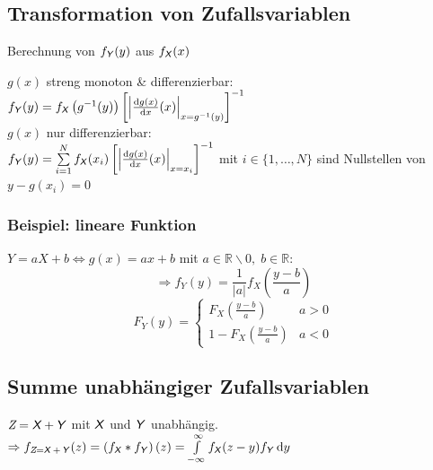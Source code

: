 \documentclass[german,color,6pt]{latex4ei/latex4ei_sheet}
\begin{document}
\begin{sectionbox}
	\subsection{Transformation von Zufallsvariablen}
	Berechnung von $f_{\operatorname{\textsf{\textit{Y}}}}(y)$ aus $f_{\operatorname{\textsf{\textit{X}}}}(x)$
	
	$g(x)$ streng monoton \& differenzierbar:\\
	$f_{\Y}(y) = f_{\X}\left(g^{-1}(y)\right)\left[\abs{\frac{\diff g(x)}{\diff x}(x)}_{x = g^{-1}(y)}\right]^{-1}$\\
	$g(x)$ nur differenzierbar:\\
	$f_{\Y}(y) = \sum\limits_{i = 1}^{N}{f_{\X}(x_i)\left[\abs{\frac{\diff g(x)}{\diff x}(x)}_{x = x_i}\right]^{-1}}$
	mit $i \in \{1,\dots,N\}$ sind Nullstellen von $y - g(x_i) = 0$
	\subsubsection{Beispiel: lineare Funktion}
	$Y=aX+b \Leftrightarrow g(x)=ax+b$ mit $a\in\mathbb{R}\backslash 0,\;b\in\mathbb{R}$:
	\[\Rightarrow f_Y(y)=\frac{1}{|a|}f_X\left(\frac{y-b}{a}\right)\]
	\[F_Y(y)=\begin{cases}F_X\left(\frac{y-b}{a}\right) & a>0 \\ 1-F_X\left(\frac{y-b}{a}\right) & a<0\end{cases}\]
	
\end{sectionbox}

\begin{sectionbox}
	\subsection{Summe unabhängiger Zufallsvariablen}
	$\textit{Z} = \operatorname{\textsf{\textit{X}}} + \operatorname{\textsf{\textit{Y}}}$ mit $\operatorname{\textsf{\textit{X}}}$ und $\operatorname{\textsf{\textit{Y}}}$ unabhängig.\\
	$\Ra f_{\textit{Z} = \X + \Y}(z) = \left(f_{\X} \ast f_{\Y}\right)(z) = \int\limits_{-\infty}^{\infty}{f_{\X}(z-y)f_{\Y}\diff y}$
\end{sectionbox}

\end{document}
